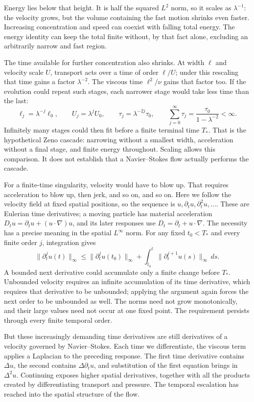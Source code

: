 Energy lies below that height. It is half the squared \(L^2\) norm, so it
scales as \(\lambda^{-1}\): the velocity grows, but the volume containing the fast
motion shrinks even faster. Increasing concentration and speed can coexist
with falling total energy. The energy identity can keep the total finite
without, by that fact alone, excluding an arbitrarily narrow and fast region.

The time available for further concentration also shrinks. At width
\(\ell\) and velocity scale \(U\), transport acts over a time of order
\(\ell/U\); under this rescaling that time gains a factor
\(\lambda^{-2}\). The viscous time \(\ell^2/\nu\) gains that factor too.
If the evolution could repeat such stages, each narrower stage would take
less time than the last:
\[
 \ell_j=\lambda^{-j}\ell_0,
 \qquad U_j=\lambda^jU_0,
 \qquad \tau_j=\lambda^{-2j}\tau_0,
 \qquad
 \sum_{j=0}^{\infty}\tau_j
 =\frac{\tau_0}{1-\lambda^{-2}}<\infty.
\]
Infinitely many stages could then fit before a finite terminal time \(T_*\). That
is the hypothetical Zeno cascade: narrowing without a smallest width,
acceleration without a final stage, and finite energy throughout. Scaling
allows this comparison. It does not establish that a Navier--Stokes flow
actually performs the cascade.

For a finite-time singularity, velocity would have to blow up. That requires
acceleration to blow up, then jerk, and so on, and so on. Here we follow the
velocity field at fixed spatial positions, so the sequence is
\(u,\partial_tu,\partial_t^2u,\ldots\). These are Eulerian time derivatives;
a moving particle has material acceleration
\(D_tu=\partial_tu+(u\cdot\nabla)u\), and its later responses use
\(D_t=\partial_t+u\cdot\nabla\).
The necessity has a precise meaning in the spatial \(L^\infty\) norm.
For any fixed \(t_0<T_*\) and every finite order \(j\), integration gives
\[
 \|\partial_t^ju(t)\|_\infty
 \le \|\partial_t^ju(t_0)\|_\infty
 +\int_{t_0}^{t}\|\partial_t^{j+1}u(s)\|_\infty\,ds.
\]
A bounded next derivative could accumulate only a finite change before
\(T_*\). Unbounded velocity requires an infinite accumulation of its time
derivative, which requires that derivative to be unbounded; applying the
argument again forces the next order to be unbounded as well. The norms
need not grow monotonically, and their large values need not occur at one
fixed point. The requirement persists through every finite temporal order.

But these increasingly demanding time derivatives are still derivatives of
a velocity governed by Navier--Stokes. Each time we differentiate, the
viscous term applies a Laplacian to the preceding response. The first time
derivative contains \(\Delta u\), the second contains
\(\Delta\partial_tu\), and substitution of the first equation brings in
\(\Delta^2u\). Continuing exposes higher spatial derivatives, together
with all the products created by differentiating transport and pressure.
The temporal escalation has reached into the spatial structure of the flow.

